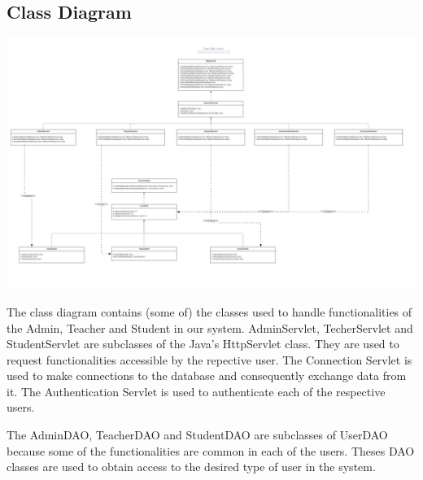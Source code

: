 \subsection{Class Diagram}

\includegraphics[width=\textwidth]{images/ClassDiagram.png}

The class diagram contains (some of) the classes used to handle functionalities of the Admin, Teacher and Student in our system. 
AdminServlet, TecherServlet and StudentServlet are subclasses of the Java's HttpServlet class. They are used to 
request functionalities accessible by the repective user. The Connection Servlet is used to make connections 
to the database and consequently exchange data from it. The Authentication Servlet is used 
to authenticate each of the respective users. 


The AdminDAO, TeacherDAO and StudentDAO are subclasses of UserDAO because some of the 
functionalities are common in each of the users. Theses DAO classes are used to obtain 
access to the desired type of user in the system.